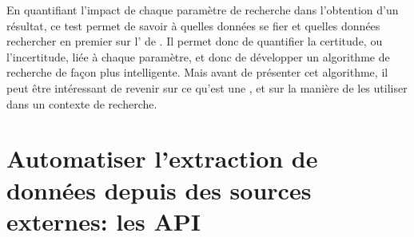 En quantifiant l'impact de chaque paramètre de recherche dans l'obtention d'un résultat, ce test permet de savoir à quelles données se fier et quelles données rechercher en premier sur l'\api{} de \wkd{}. Il permet donc de quantifier la certitude, ou l'incertitude, liée à chaque paramètre, et donc de développer un algorithme de recherche de façon plus intelligente. Mais avant de présenter cet algorithme, il peut être intéressant de revenir sur ce qu'est une \api{}, et sur la manière de les utiliser dans un contexte de recherche.

\section{Automatiser l'extraction de données depuis des sources externes: les API}
